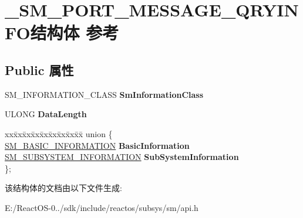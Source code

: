 \hypertarget{struct___s_m___p_o_r_t___m_e_s_s_a_g_e___q_r_y_i_n_f_o}{}\section{\+\_\+\+S\+M\+\_\+\+P\+O\+R\+T\+\_\+\+M\+E\+S\+S\+A\+G\+E\+\_\+\+Q\+R\+Y\+I\+N\+F\+O结构体 参考}
\label{struct___s_m___p_o_r_t___m_e_s_s_a_g_e___q_r_y_i_n_f_o}
\subsection*{Public 属性}
\begin{DoxyCompactItemize}
\item 
\mbox{\label{struct___s_m___p_o_r_t___m_e_s_s_a_g_e___q_r_y_i_n_f_o_ae57c1c999703fbedc190351e87d4f7b5}} 
S\+M\+\_\+\+I\+N\+F\+O\+R\+M\+A\+T\+I\+O\+N\+\_\+\+C\+L\+A\+SS {\bfseries Sm\+Information\+Class}
\item 
\mbox{\label{struct___s_m___p_o_r_t___m_e_s_s_a_g_e___q_r_y_i_n_f_o_ac5d1c88faaaf022ec7f34124afb905fd}} 
U\+L\+O\+NG {\bfseries Data\+Length}
\item 
\mbox{\label{struct___s_m___p_o_r_t___m_e_s_s_a_g_e___q_r_y_i_n_f_o_a95d75436774e4c8da5b63ce7f1af1694}} 
\begin{tabbing}
xx\=xx\=xx\=xx\=xx\=xx\=xx\=xx\=xx\=\kill
union \{\\
\>\hyperlink{struct___s_m___b_a_s_i_c___i_n_f_o_r_m_a_t_i_o_n}{SM\_BASIC\_INFORMATION} {\bfseries BasicInformation}\\
\>\hyperlink{struct___s_m___s_u_b_s_y_s_t_e_m___i_n_f_o_r_m_a_t_i_o_n}{SM\_SUBSYSTEM\_INFORMATION} {\bfseries SubSystemInformation}\\
\}; \\

\end{tabbing}\end{DoxyCompactItemize}


该结构体的文档由以下文件生成\+:\begin{DoxyCompactItemize}
\item 
E\+:/\+React\+O\+S-\/0../sdk/include/reactos/subsys/sm/api.\+h\end{DoxyCompactItemize}
